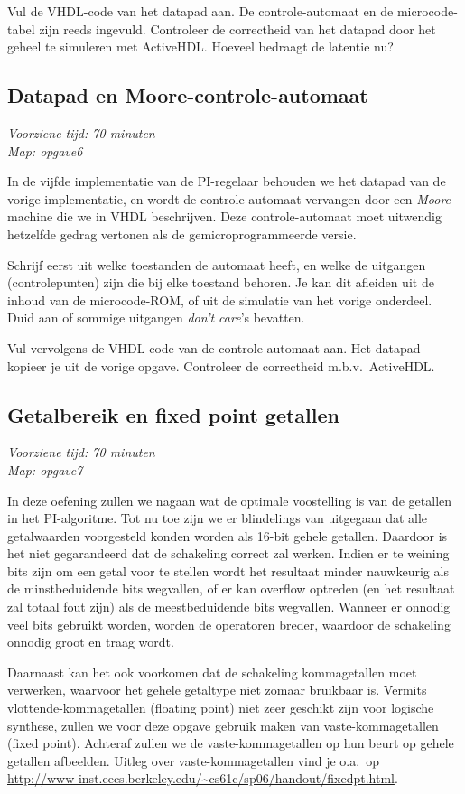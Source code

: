 Vul de VHDL-code van het datapad aan. De controle-automaat en de
microcode-tabel zijn reeds ingevuld. Controleer de correctheid van het
datapad door het geheel te simuleren met ActiveHDL.  Hoeveel bedraagt
de latentie nu?

\subsection{Datapad en Moore-controle-automaat}
{\em Voorziene tijd: 70 minuten} \\
{\em Map: opgave6}

In de vijfde implementatie van de PI-regelaar behouden we het datapad
van de vorige implementatie, en wordt de controle-automaat vervangen
door een {\em Moore}-machine die we in VHDL beschrijven. Deze
controle-automaat moet uitwendig hetzelfde gedrag vertonen als de
gemicroprogrammeerde versie.

Schrijf eerst uit welke toestanden de automaat heeft, en welke de
uitgangen (controlepunten) zijn die bij elke toestand behoren. Je kan
dit afleiden uit de inhoud van de microcode-ROM, of uit de simulatie
van het vorige onderdeel. Duid aan of sommige uitgangen {\em don't
care}'s bevatten.

Vul vervolgens de VHDL-code van de controle-automaat aan. Het datapad
kopieer je uit de vorige opgave. Controleer de correctheid m.b.v.\
ActiveHDL.


\subsection{Getalbereik en fixed point getallen}
{\em Voorziene tijd: 70 minuten} \\
{\em Map: opgave7}

In deze oefening zullen we nagaan wat de optimale voostelling is van
de getallen in het PI-algoritme.  Tot nu toe zijn we er blindelings
van uitgegaan dat alle getalwaarden voorgesteld konden worden als
16-bit gehele getallen. Daardoor is het niet gegarandeerd dat de
schakeling correct zal werken. Indien er te weining bits zijn om een
getal voor te stellen wordt het resultaat minder nauwkeurig als de
minstbeduidende bits wegvallen, of er kan overflow optreden (en het
resultaat zal totaal fout zijn) als de meestbeduidende bits
wegvallen. Wanneer er onnodig veel bits gebruikt worden, worden de
operatoren breder, waardoor de schakeling onnodig groot en traag
wordt.

Daarnaast kan het ook voorkomen dat de schakeling kommagetallen moet
verwerken, waarvoor het gehele getaltype niet zomaar bruikbaar is.
Vermits vlottende-kommagetallen (floating point) niet zeer geschikt
zijn voor logische synthese, zullen we voor deze opgave gebruik maken
van vaste-kommagetallen (fixed point). Achteraf zullen we de
vaste-kommagetallen op hun beurt op gehele getallen afbeelden.  Uitleg
over vaste-kommagetallen vind je o.a.\ op \\ 
\small{\url{http://www-inst.eecs.berkeley.edu/~cs61c/sp06/handout/fixedpt.html}}.

